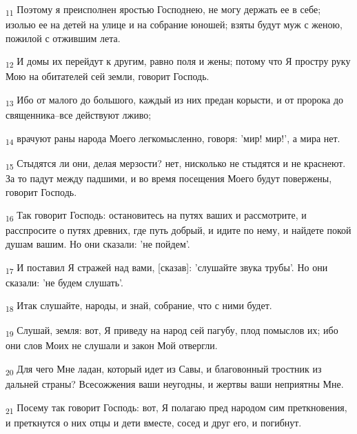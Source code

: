 \begin{tcolorbox}
\textsubscript{11} Поэтому я преисполнен яростью Господнею, не могу держать ее в себе; изолью ее на детей на улице и на собрание юношей; взяты будут муж с женою, пожилой с отжившим лета.
\end{tcolorbox}
\begin{tcolorbox}
\textsubscript{12} И домы их перейдут к другим, равно поля и жены; потому что Я простру руку Мою на обитателей сей земли, говорит Господь.
\end{tcolorbox}
\begin{tcolorbox}
\textsubscript{13} Ибо от малого до большого, каждый из них предан корысти, и от пророка до священника--все действуют лживо;
\end{tcolorbox}
\begin{tcolorbox}
\textsubscript{14} врачуют раны народа Моего легкомысленно, говоря: 'мир! мир!', а мира нет.
\end{tcolorbox}
\begin{tcolorbox}
\textsubscript{15} Стыдятся ли они, делая мерзости? нет, нисколько не стыдятся и не краснеют. За то падут между падшими, и во время посещения Моего будут повержены, говорит Господь.
\end{tcolorbox}
\begin{tcolorbox}
\textsubscript{16} Так говорит Господь: остановитесь на путях ваших и рассмотрите, и расспросите о путях древних, где путь добрый, и идите по нему, и найдете покой душам вашим. Но они сказали: 'не пойдем'.
\end{tcolorbox}
\begin{tcolorbox}
\textsubscript{17} И поставил Я стражей над вами, [сказав]: 'слушайте звука трубы'. Но они сказали: 'не будем слушать'.
\end{tcolorbox}
\begin{tcolorbox}
\textsubscript{18} Итак слушайте, народы, и знай, собрание, что с ними будет.
\end{tcolorbox}
\begin{tcolorbox}
\textsubscript{19} Слушай, земля: вот, Я приведу на народ сей пагубу, плод помыслов их; ибо они слов Моих не слушали и закон Мой отвергли.
\end{tcolorbox}
\begin{tcolorbox}
\textsubscript{20} Для чего Мне ладан, который идет из Савы, и благовонный тростник из дальней страны? Всесожжения ваши неугодны, и жертвы ваши неприятны Мне.
\end{tcolorbox}
\begin{tcolorbox}
\textsubscript{21} Посему так говорит Господь: вот, Я полагаю пред народом сим преткновения, и преткнутся о них отцы и дети вместе, сосед и друг его, и погибнут.
\end{tcolorbox}
